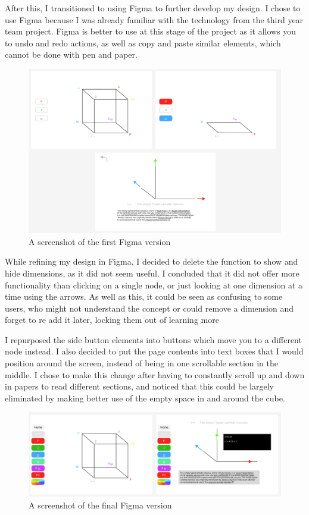 \documentclass{l4proj}
\begin{document}
After this, I transitioned to using Figma to further develop my design.  I chose to use Figma because I was already familiar with the technology from the third year team project.  Figma is better to use at this stage of the project as it allows you to undo and redo actions, as well as copy and paste similar elements, which cannot be done with pen and paper.

\begin{figure}[h!]
    \centering
    \includegraphics[width=1\linewidth]{dissertation/images/v1_full_taller.png}
    \caption{A screenshot of the first Figma version}
    \label{fig:enter-label}
\end{figure}

While refining my design in Figma, I decided to delete the function to show and hide dimensions, as it did not seem useful.  I concluded that it did not offer more functionality than clicking on a single node, or just looking at one dimension at a time using the arrows.  As well as this, it could be seen as confusing to some users, who might not understand the concept or could remove a dimension and forget to re add it later, locking them out of learning more

I repurposed the side button elements into buttons which move you to a different node instead.  I also decided to put the page contents into text boxes that I would position around the screen, instead of being in one scrollable section in the middle.  I chose to make this change after having to constantly scroll up and down in papers to read different sections, and noticed that this could be largely eliminated by making better use of the empty space in and around the cube.

\begin{figure}[h!]
    \centering
    \includegraphics[width=1\linewidth]{dissertation/images/v2_full.png}
    \caption{A screenshot of the final Figma version}
    \label{fig:enter-label}
\end{figure}
\end{document}

